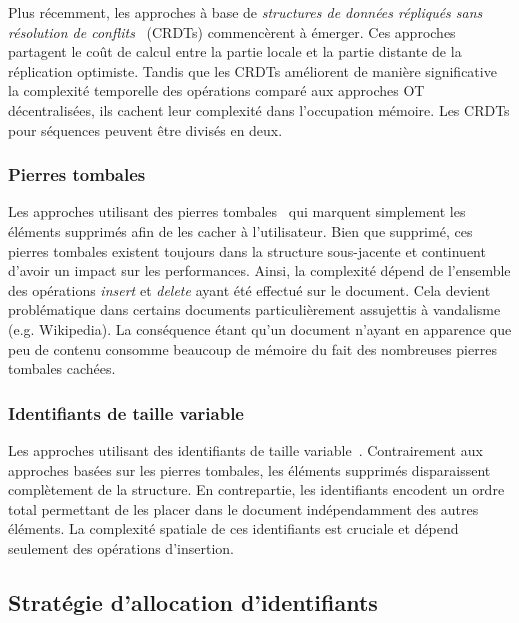 Plus récemment, les approches à base de \emph{structures de données répliqués
  sans résolution de conflits}~\cite{shapiro2011comprehensive,
  shapiro2011conflict} (CRDTs) commencèrent à émerger. Ces approches partagent
le coût de calcul entre la partie locale et la partie distante de la réplication
optimiste. Tandis que les CRDTs améliorent de manière significative la
complexité temporelle des opérations comparé aux approches OT décentralisées,
ils cachent leur complexité dans l'occupation mémoire. Les CRDTs pour séquences
peuvent être divisés en deux.

\subsubsection{Pierres tombales}

Les approches utilisant des pierres tombales~\cite{ahmed2011evaluating,
  conway2014language, grishchenko2010deep, oster2006data,
  preguica2009commutative, roh2011replicated, weiss2007wooki, wu2010partial,
  Yu2012stringwise} qui marquent simplement les éléments supprimés afin de les
cacher à l'utilisateur. Bien que supprimé, ces pierres tombales existent
toujours dans la structure sous-jacente et continuent d'avoir un impact sur les
performances. Ainsi, la complexité dépend de l'ensemble des opérations
\emph{insert} et \emph{delete} ayant été effectué sur le document. Cela devient
problématique dans certains documents particulièrement assujettis à vandalisme
(e.g. Wikipedia). La conséquence étant qu'un document n'ayant en apparence que
peu de contenu consomme beaucoup de mémoire du fait des nombreuses pierres
tombales cachées.

\subsubsection{Identifiants de taille variable}

Les approches utilisant des identifiants de taille
variable~\cite{preguica2009commutative, andre2013supporting,
  weiss2009logoot}. Contrairement aux approches basées sur les pierres tombales,
les éléments supprimés disparaissent complètement de la structure. En
contrepartie, les identifiants encodent un ordre total permettant de les placer
dans le document indépendamment des autres éléments. La complexité spatiale de
ces identifiants est cruciale et dépend seulement des opérations d'insertion.

\subsection{Stratégie d'allocation d'identifiants}

